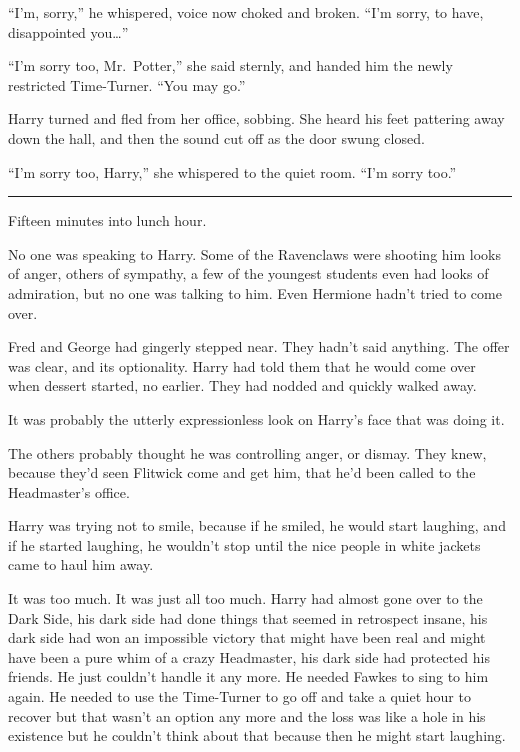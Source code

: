 ``I'm, sorry,'' he whispered, voice now choked and broken. ``I'm sorry,
to have, disappointed you\ldots{}''

``I'm sorry too, Mr.~Potter,'' she said sternly, and handed him the
newly restricted Time-Turner. ``You may go.''

Harry turned and fled from her office, sobbing. She heard his feet
pattering away down the hall, and then the sound cut off as the door
swung closed.

``I'm sorry too, Harry,'' she whispered to the quiet room. ``I'm sorry
too.''

\begin{center}\rule{3in}{0.4pt}\end{center}

Fifteen minutes into lunch hour.

No one was speaking to Harry. Some of the Ravenclaws were shooting him
looks of anger, others of sympathy, a few of the youngest students even
had looks of admiration, but no one was talking to him. Even Hermione
hadn't tried to come over.

Fred and George had gingerly stepped near. They hadn't said anything.
The offer was clear, and its optionality. Harry had told them that he
would come over when dessert started, no earlier. They had nodded and
quickly walked away.

It was probably the utterly expressionless look on Harry's face that was
doing it.

The others probably thought he was controlling anger, or dismay. They
knew, because they'd seen Flitwick come and get him, that he'd been
called to the Headmaster's office.

Harry was trying not to smile, because if he smiled, he would start
laughing, and if he started laughing, he wouldn't stop until the nice
people in white jackets came to haul him away.

It was too much. It was just all too much. Harry had almost gone over to
the Dark Side, his dark side had done things that seemed in retrospect
insane, his dark side had won an impossible victory that might have been
real and might have been a pure whim of a crazy Headmaster, his dark
side had protected his friends. He just couldn't handle it any more. He
needed Fawkes to sing to him again. He needed to use the Time-Turner to
go off and take a quiet hour to recover but that wasn't an option any
more and the loss was like a hole in his existence but he couldn't think
about that because then he might start laughing.

